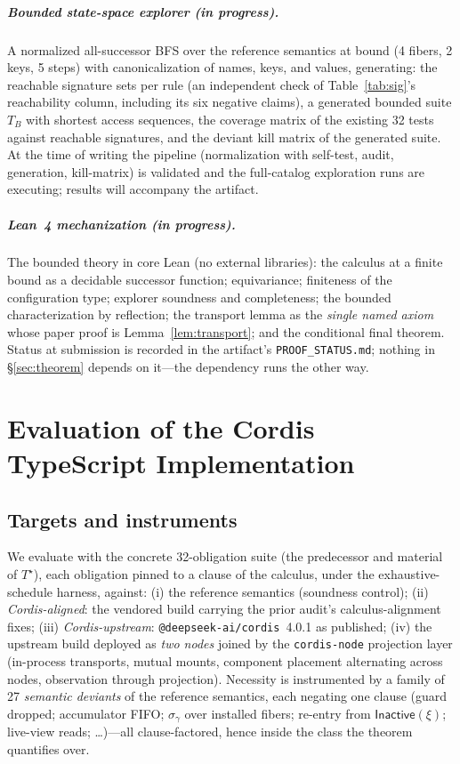 \documentclass[sigplan,screen,review,nonacm]{acmart}
\newcommand{\Tstar}{\ensuremath{T^{\star}}}
\newcommand{\Inactive}{\mathsf{Inactive}}
\begin{document}
\subparagraph{Bounded state-space explorer (in progress).} A normalized
all-successor BFS over the reference semantics at bound (4 fibers, 2 keys,
5 steps) with canonicalization of names, keys, and values, generating: the
reachable signature sets per rule (an independent check of
Table~\ref{tab:sig}'s reachability column, including its six negative claims),
a generated bounded suite $T_B$ with shortest access sequences, the coverage
matrix of the existing 32 tests against reachable signatures, and the deviant
kill matrix of the generated suite. At the time of writing the pipeline
(normalization with self-test, audit, generation, kill-matrix) is validated
and the full-catalog exploration runs are executing; results will accompany
the artifact.

\subparagraph{Lean~4 mechanization (in progress).} The bounded theory in core
Lean (no external libraries): the calculus at a finite bound as a decidable
successor function; equivariance; finiteness of the configuration type;
explorer soundness and completeness; the bounded characterization by
reflection; the transport lemma as the \emph{single named axiom} whose paper
proof is Lemma~\ref{lem:transport}; and the conditional final theorem. Status
at submission is recorded in the artifact's \texttt{PROOF\_STATUS.md}; nothing
in \S\ref{sec:theorem} depends on it---the dependency runs the other way.

\section{Evaluation of the Cordis TypeScript Implementation}
\label{sec:evaluation}

\subsection{Targets and instruments}

We evaluate with the concrete 32-obligation suite (the predecessor and
material of \Tstar), each obligation pinned to a clause of the calculus, under
the exhaustive-schedule harness, against:
(i) the reference semantics (soundness control);
(ii) \emph{Cordis-aligned}: the vendored build carrying the prior audit's
calculus-alignment fixes;
(iii) \emph{Cordis-upstream}: \texttt{@deepseek-ai/cordis}~4.0.1 as published;
(iv) the upstream build deployed as \emph{two nodes} joined by the
\texttt{cordis-node} projection layer (in-process transports, mutual mounts,
component placement alternating across nodes, observation through projection).
Necessity is instrumented by a family of 27 \emph{semantic deviants} of the
reference semantics, each negating one clause (guard dropped; accumulator
FIFO; $\sigma_\gamma$ over installed fibers; re-entry from $\Inactive(\xi)$;
live-view reads; \dots)---all clause-factored, hence inside the class the
theorem quantifies over.
\end{document}
